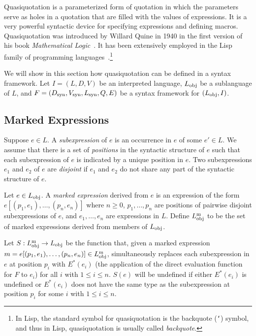 \documentclass[11pt,fleqn]{article}
\newcommand{\bsp}{\begin{sloppypar}}
\newcommand{\esp}{\end{sloppypar}}
\newcommand{\mlist}[1]{{[ #1 ]}}
\newcommand{\tarrow}{\rightarrow}
\begin{document}
Quasiquotation is a parameterized form of quotation in which the
parameters serve as holes in a quotation that are filled with the
values of expressions.  It is a very powerful syntactic device for
specifying expressions and defining macros.  Quasiquotation was
introduced by Willard Quine in 1940 in the first version of his book
\emph{Mathematical Logic}~\cite{Quine03}.  It has been extensively
employed in the Lisp family of programming
languages~\cite{Bawden99}.\footnote{In Lisp, the standard symbol for
  quasiquotation is the backquote (\texttt{`}) symbol, and thus in
  Lisp, quasiquotation is usually called \emph{backquote}.}

\bsp We will show in this section how quasiquotation can be defined in
a syntax framework.  Let $I=(L,D,V)$ be an interpreted language, $L_{\rm
  obj}$ be a sublanguage of $L$, and $F=(D_{\rm syn}, V_{\rm syn},
L_{\rm syn}, Q, E)$ be a syntax framework for $(L_{\rm obj},I)$. \esp

\subsection{Marked Expressions} \label{subsec:marked-expr}

Suppose $e \in L$.  A \emph{subexpression} of $e$ is an occurrence in
$e$ of some $e' \in L$.  We assume that there is a set of
\emph{positions} in the syntactic structure of $e$ such that each
subexpression of $e$ is indicated by a unique position in $e$.  Two
subexpressions $e_1$ and $e_2$ of $e$ are \emph{disjoint} if $e_1$ and
$e_2$ do not share any part of the syntactic structure of $e$.

Let $e \in L_{\rm obj}$.  A \emph{marked expression} derived from $e$
is an expression of the form $e\mlist{(p_1,e_1),\ldots,(p_n,e_n)}$
where $n \ge 0$, $p_1,\ldots,p_n$ are positions of pairwise disjoint
subexpressions of $e$, and $e_1,\ldots,e_n$ are expressions in $L$.
Define $L^{\rm m}_{\rm obj}$ to be the set of marked expressions
derived from members of $L_{\rm obj}$.

\bsp Let $S: L^{\rm m}_{\rm obj} \tarrow L_{\rm obj}$ be the function
that, given a marked expression $m =
e\mlist{(p_1,e_1),\ldots,(p_n,e_n)} \in L^{\rm m}_{\rm obj}$,
simultaneously replaces each subexpression in $e$ at position $p_i$
with $E^{\ast}(e_i)$ (the application of the direct evaluation
function for $F$ to $e_i$) for all $i$ with $1 \le i \le n$.  $S(e)$
will be undefined if either $E^{\ast}(e_i)$ is undefined or
$E^{\ast}(e_i)$ does not have the same type as the subexpression at
position $p_i$ for some $i$ with $1 \le i \le n$.  \esp
\end{document}
